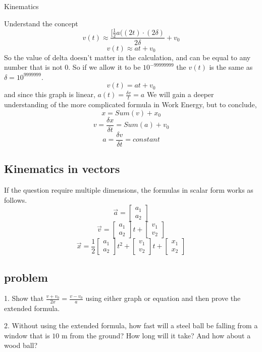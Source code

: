 \documentclass[]{scrreprt}
\begin{document}
\begin{section} {Kinematics}
\begin{subsection}{Understand the concept}
		$$v(t) \approx \frac{[\frac{1}{2}a((2t)\cdot(2\delta)}{2\delta} + v_0$$ 	
		$$v(t)\approx at+v_0$$
		So the value of delta doesn't matter in the calculation, and can be equal to any number that is not $0$. So if we allow it to be $10^{-99999999}$ the $v(t)$ is the same as $\delta = 10^{9999999}$.
		$$v(t) = at+v_0$$
		and since this graph is linear,
		$a(t) = \frac{\delta v}{t} =a$		
		We will gain a deeper understanding of the more complicated formula in Work Energy, but to conclude,
		$$x = Sum (v) + x_0$$
		$$v = \frac{\delta x}{\delta t} = Sum (a) + v_0$$
		$$a = \frac{\delta v}{\delta t} = constant$$ 	
\end{subsection} 
\subsection{Kinematics in vectors}
If the question require multiple dimensions, the formulas in scalar form works as follows.
$$\vec{a} = 
\begin{bmatrix}
	a_1\\
	a_2
\end{bmatrix}$$
$$\vec{v} = 
\begin{bmatrix}
	a_1 \\
	a_2 
\end{bmatrix}
t+
\begin{bmatrix}
	v_1\\
	v_2
\end{bmatrix}
$$
$$\vec{x} = 
\frac{1}{2}
\begin{bmatrix}
	a_1 \\
	a_2 
\end{bmatrix}
t^2+
\begin{bmatrix}
	v_1\\
	v_2
\end{bmatrix}
t+
\begin{bmatrix}
	x_1\\
	x_2
\end{bmatrix}
$$

\end{section}

\subsection{problem}
1. Show that $\frac{v+v_0}{2x} =\frac{v-v_0}{a}$ using either graph or equation and then prove the extended formula.

2. Without using the extended formula, how fast will a steel ball be falling from a window that is $10$ m from the ground? How long will it take? And how about a wood ball?
\end{document}
